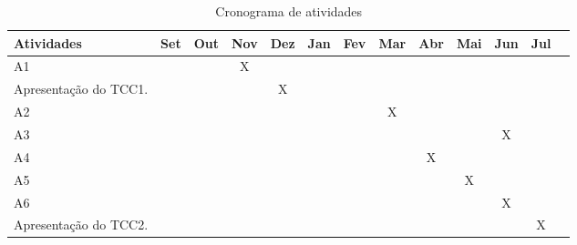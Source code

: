     \begin{table}[ht]
        \centering
        \begin{tabular}{|l|c|c|c|c|c|c|c|c|c|c|c|c|}
        \hline
        \textbf{Atividades} & \textbf{Set} & \textbf{Out} & \textbf{Nov} & \textbf{Dez} & \textbf{Jan} & \textbf{Fev} & \textbf{Mar} & \textbf{Abr} & \textbf{Mai} & \textbf{Jun} & \textbf{Jul} \\ \hline
        A1  &   &   & X &   &   &   &   &   &   &   &   \\ \hline
        Apresentação do TCC1. &   &   &   & X &   &   &   &   &   &   &   \\ \hline
        A2  &   &   &   &   &   &   & X &   &   &   &   \\ \hline
        A3  &   &   &   &   &   &   &   &   &   & X &   \\ \hline
        A4  &   &   &   &   &   &   &   & X &   &   &   \\ \hline
        A5  &   &   &   &   &   &   &   &   & X &   &   \\ \hline
        A6  &   &   &   &   &   &   &   &   &   & X &   \\ \hline
        Apresentação do TCC2. &   &   &   &   &   &   &   &   &   &   & X \\ \hline
        \end{tabular}
        \caption{Cronograma de atividades}
        \label{tab:cronograma}
    \end{table}